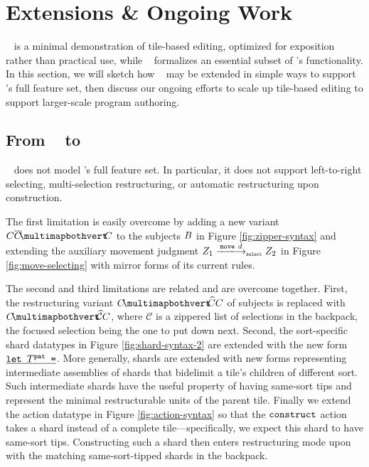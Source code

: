 \section{Extensions \& Ongoing Work}

\tylr~ is a minimal demonstration of tile-based
editing, optimized for exposition rather than practical use,
while \ty~ formalizes an essential subset of \tylr's functionality.
In this section, we will sketch how \ty~ may be extended
in simple ways to support \tylr's full feature set,
then discuss our ongoing efforts to scale up tile-based
editing to support larger-scale program authoring.

\subsection{From \ty~ to \tylr}

\ty~ does not model \tylr's full feature set.
In particular, it does not support left-to-right selecting,
multi-selection restructuring, or automatic restructuring
upon construction.

The first limitation is easily overcome by adding
a new variant $\selectingRight{\selection}{\selection}{\selection}$
to the subjects $B$ in Figure \ref{fig:zipper-syntax}
and extending the auxiliary movement judgment
$\smove{\editState_1}{\direction}{\editState_2}$
in Figure \ref{fig:move-selecting}
with mirror forms of its current rules.

The second and third limitations are related
and are overcome together.
First, the restructuring variant $\restructuring{\selection}{\selection}{\selection}$
of subjects is replaced with $\restructuring{\selection}{\mathcal{C}}\selection$,
where $\mathcal{C}$ is a zippered list of selections in the backpack,
the focused selection being the one to put down next.
Second, the sort-specific shard datatypes in Figure \ref{fig:shard-syntax-2}
are extended with
the new form $\underline{\texttt{$\texttt{let}~T^{\texttt{pat}}~\texttt{=}$}}$.
More generally, shards are extended with new forms
representing intermediate assemblies of shards that
bidelimit a tile's children of different sort.
Such intermediate shards have the useful property of having same-sort
tips and represent the minimal restructurable units of the
parent tile.
Finally we extend the action datatype in Figure \ref{fig:action-syntax}
so that the $\texttt{construct}$ action takes a shard instead of
a complete tile---specifically, we expect this shard to have same-sort tips.
Constructing such a shard then enters restructuring mode
upon with the matching same-sort-tipped shards in the backpack.


